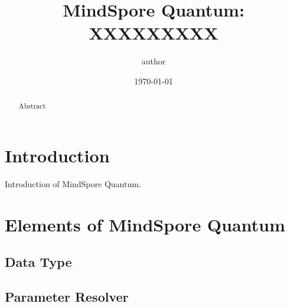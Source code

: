 \documentclass[pra,twocolumn,superscriptaddress,floatfix,nofootinbib,amsmath,amssymb]{revtex4-1}
\begin{document}
\title{MindSpore Quantum: XXXXXXXXX
}



\author{author}


\date{\today}



\begin{abstract}
    Abstract
\end{abstract}
\maketitle
\tableofcontents

\section{Introduction}
Introduction of MindSpore Quantum.


\section{Elements of MindSpore Quantum}

\subsection{Data Type}


\subsection{Parameter Resolver}


% 

% 

% 
\end{document}
